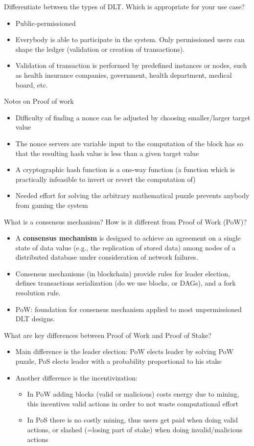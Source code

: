 \documentclass{article}
\begin{document}
Differentiate between the types of DLT. Which is appropriate for your use case?
\begin{itemize}
    \item Public-permissioned
    \item Everybody is able to participate in the system. Only permissioned users can shape the ledger (validation or creation of transactions).
    \item Validation of transaction is performed by predefined instances or nodes, such as health insurance companies, government, health department, medical board, etc.
\end{itemize}
Notes on Proof of work
\begin{itemize}
    \item Difficulty of finding a nonce can be adjusted by choosing smaller/larger target value
    \item The nonce servers are variable input to the computation of the block has so that the resulting hash value is less than a given target value
    \item A cryptographic hash function is a one-way function (a function which is practically infeasible to invert or revert the computation of)
    \item Needed effort for solving the arbitrary mathematical puzzle prevents anybody from gaming the system
\end{itemize}
What is a consensus mechanism? How is it different from Proof of Work (PoW)?
\begin{itemize}
    \item A \textbf{consensus mechanism} is designed to achieve an agreement on a single state of data value (e.g., the replication of stored data) among nodes of a distributed database under consideration of network failures.
    \item Consensus mechanisms (in blockchain) provide rules for leader election, defines transactions serialization (do we use blocks, or DAGs), and a fork resolution rule.
    \item PoW: foundation for consensus mechanism applied to most unpermissioned DLT designs.
\end{itemize}
What are key differences between Proof of Work and Proof of Stake?
\begin{itemize}
    \item Main difference is the leader election: PoW elects leader by solving PoW puzzle, PoS elects leader with a probability proportional to his stake
    \item Another difference is the incentivization:
          \begin{itemize}
              \item In PoW adding blocks (valid or malicious) costs energy due to mining, this incentives valid actions in order to not waste computational effort
              \item In PoS there is no costly mining, thus users get paid when doing valid actions, or slashed (=losing part of stake) when doing invalid/malicious actions
          \end{itemize}
\end{itemize}
\end{document}
